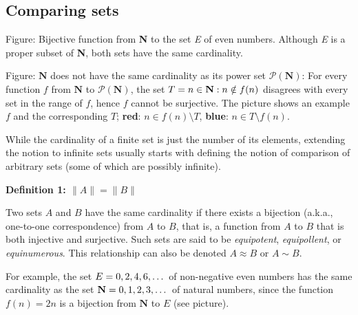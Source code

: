 \subsection{Comparing sets}
\label{sss:comp-0f41}







Figure: Bijective function from \textbf{N} to the set \textit{E} of even numbers. Although
\textit{E} is a proper subset of \textbf{N}, both sets have the same cardinality.






Figure: $\mathbf{N}$ does not have the same cardinality as its power set
$\mathcal{P}(\mathbf{N})$: For every function $f$ from $\mathbf{N}$ to
$\mathcal{P}(\mathbf{N})$, the set $T = \\{n \in \mathbf{N} : n \notin f(n)\\}$ disagrees
with every set in the range of $f$, hence $f$ cannot be surjective. The picture shows an
example $f$ and the corresponding $T$; \textbf{red}: $n \in f(n) \setminus T$,
\textbf{blue}: $n \in T \setminus f(n)$.



While the cardinality of a finite set is just the number of its elements, extending the
notion to infinite sets usually starts with defining the notion of comparison of arbitrary
sets (some of which are possibly infinite).



\textbf{Definition 1: $\|A\| = \|B\|$}



Two sets $A$ and $B$ have the same cardinality if there exists a bijection (a.k.a.,
one-to-one correspondence) from $A$ to $B$, that is, a function from $A$ to $B$ that is
both injective and surjective. Such sets are said to be \textit{equipotent},
\textit{equipollent}, or \textit{equinumerous}. This relationship can also be denoted $A
\approx B$ or $A \sim B$.



For example, the set $E = \\{0, 2, 4, 6, \ldots\\}$ of non-negative even numbers has the
same cardinality as the set $\mathbf{N} = \\{0, 1, 2, 3, \ldots\\}$ of natural numbers,
since the function $f(n) = 2n$ is a bijection from $\mathbf{N}$ to $E$ (see picture).



